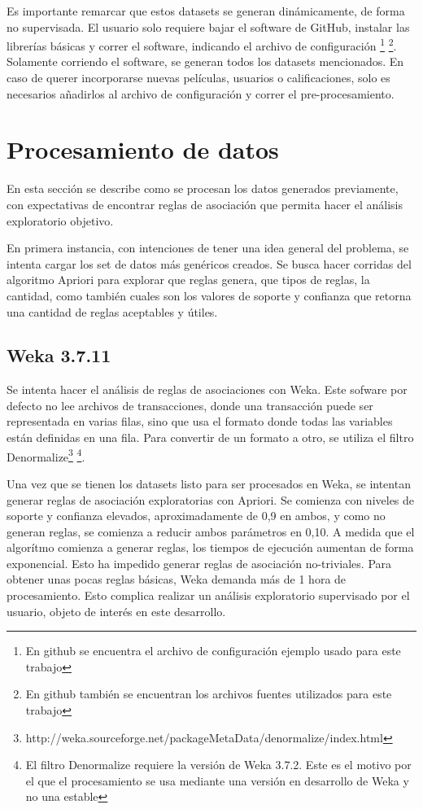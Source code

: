 \documentclass[journal]{IEEEtran}
\begin{document}
Es importante remarcar que estos datasets se generan dinámicamente, de forma 
no supervisada. El usuario solo requiere bajar el software de GitHub, instalar
las librerías básicas y correr el software, indicando el archivo de configuración
\footnote{En github se encuentra el archivo de configuración ejemplo usado para este trabajo}
\footnote{En github también se encuentran los archivos fuentes utilizados para este trabajo}. 
Solamente corriendo el software, se generan todos los datasets mencionados.  En caso de
querer incorporarse nuevas películas, usuarios o calificaciones, solo es necesarios
añadirlos al archivo de configuración y correr el pre-procesamiento.





\section{Procesamiento de datos}
En esta sección se describe como se procesan los datos generados previamente, 
con expectativas de encontrar reglas de asociación que permita hacer el
análisis exploratorio objetivo.

En primera instancia, con intenciones de tener una idea general del problema,
se intenta cargar los set de datos más genéricos creados. Se busca hacer 
corridas del algoritmo Apriori para explorar
que reglas genera, que tipos de reglas, la cantidad, como
también cuales son los valores de soporte y confianza que retorna una cantidad
de reglas aceptables y útiles. 

\subsection{Weka 3.7.11}
Se intenta hacer el análisis de reglas de asociaciones con Weka. Este sofware por defecto
no lee archivos de transacciones, donde una transacción puede ser representada en varias filas,
 sino que usa el formato donde todas las variables están definidas en una fila. Para convertir
de un formato a otro, se utiliza el filtro 
Denormalize\footnote{http://weka.sourceforge.net/packageMetaData/denormalize/index.html}
\footnote{El filtro Denormalize requiere la versión de Weka 3.7.2. Este es el motivo por el que 
el procesamiento se usa mediante una versión en desarrollo de Weka y no una estable}. 

Una vez que se tienen los datasets listo para ser procesados en Weka, se intentan generar reglas
de asociación exploratorias con Apriori. Se comienza con niveles de soporte y confianza elevados,
aproximadamente de 0,9 en ambos, y como no generan reglas, se comienza a reducir ambos parámetros
en 0,10. A medida que el algorítmo comienza a generar reglas, los tiempos de ejecución aumentan
de forma exponencial. Esto ha impedido generar reglas de asociación no-triviales. Para obtener
unas pocas reglas básicas, Weka demanda más de 1 hora de procesamiento. Esto complica realizar un análisis
exploratorio supervisado por el usuario, objeto de interés en este desarrollo.
\end{document}
